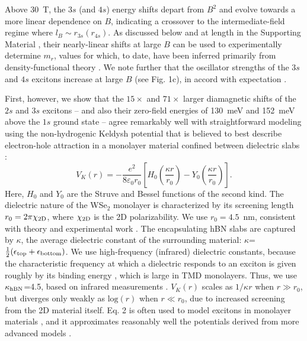 \documentclass[aps,prl,twocolumn]{revtex4-1}
\begin{document}
Above 30~T, the $3s$ (and $4s$) energy shifts depart from $B^2$ and evolve towards a more linear dependence on $B$, indicating a crossover to the intermediate-field regime where $l_B \sim r_{3s} (r_{4s})$. As discussed below and at length in the Supporting Material \cite{SM}, their nearly-linear shifts at large $B$ can be used to experimentally determine $m_r$, values for which, to date, have been inferred primarily from density-functional theory \cite{Kyla, Berkelbach}. We note further that the oscillator strengths of the $3s$ and $4s$ excitons increase at large $B$ (see Fig. 1c), in accord with expectation \cite{Hasegawa}.

First, however, we show that the $15 \times$ and $71 \times$ larger diamagnetic shifts of the $2s$ and $3s$ excitons -- and also their zero-field energies of 130~meV and 152~meV above the $1s$ ground state -- agree remarkably well with straightforward modeling using the non-hydrogenic Keldysh potential that is believed to best describe electron-hole attraction in a monolayer material confined between dielectric slabs \cite{Keldysh, Cudazzo, Berkelbach, Macdonald, Kyla}:
\begin{equation}
V_K(r)=-\frac{e^2}{8 \varepsilon_0 r_0}\left[ H_0 \left(\frac{\kappa r}{r_0} \right) - Y_0 \left(\frac{\kappa r}{r_0}\right) \right].
\end{equation}
Here, $H_0$ and $Y_0$ are the Struve and Bessel functions of the second kind. The dielectric nature of the WSe$_2$ monolayer is characterized by its screening length $r_0 = 2 \pi \chi_{\rm 2D}$, where $\chi_{\rm 2D}$ is the 2D polarizability.  We use $r_0=4.5$~nm, consistent with theory \cite{Berkelbach, Kyla} and experimental work \cite{Stier_Nano}. The encapsulating hBN slabs are captured by $\kappa$, the average dielectric constant of the surrounding material: $\kappa$=$\frac{1}{2}(\epsilon_{\rm top} + \epsilon_{\rm bottom})$. We use high-frequency (infrared) dielectric constants, because the characteristic frequency at which a dielectric responds to an exciton is given roughly by its binding energy \cite{Bechstedt, Knox}, which is large in TMD monolayers.  Thus, we use $\kappa_{\rm hBN}$=4.5, based on infrared measurements \cite{Geick}. $V_K(r)$ scales as $1/\kappa r$ when $r \gg r_0$, but diverges only weakly as $\textrm{log}(r)$ when $r \ll r_0$, due to increased screening from the 2D material itself.  Eq. 2 is often used to model excitons in monolayer materials \cite{Chernikov, Berkelbach, Kyla, Macdonald}, and it approximates reasonably well the potentials derived from more advanced models \cite{Scharf, Latini}.
\end{document}
